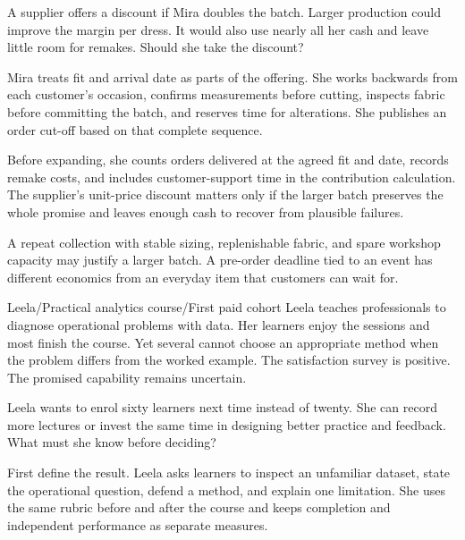 \documentclass[11pt,twoside,openright]{book}
\begin{document}
A supplier offers a discount if Mira doubles the batch. Larger production could
improve the margin per dress. It would also use nearly all her cash and leave
little room for remakes. Should she take the discount?


Mira treats fit and arrival date as parts of the offering. She works backwards
from each customer's occasion, confirms measurements before cutting, inspects
fabric before committing the batch, and reserves time for alterations. She
publishes an order cut-off based on that complete sequence.

Before expanding, she counts orders delivered at the agreed fit and date,
records remake costs, and includes customer-support time in the contribution
calculation. The supplier's unit-price discount matters only if the larger
batch preserves the whole promise and leaves enough cash to recover from
plausible failures.

A repeat collection with stable sizing, replenishable fabric, and spare workshop
capacity may justify a larger batch. A pre-order deadline tied to an event has
different economics from an everyday item that customers can wait for.

  {Leela\quad /\quad Practical analytics course\quad /\quad First paid cohort}
Leela teaches professionals to diagnose operational problems with data. Her
learners enjoy the sessions and most finish the course. Yet several cannot
choose an appropriate method when the problem differs from the worked example.
The satisfaction survey is positive. The promised capability remains uncertain.

Leela wants to enrol sixty learners next time instead of twenty. She can record
more lectures or invest the same time in designing better practice and feedback.
What must she know before deciding?


First define the result. Leela asks learners to inspect an unfamiliar dataset,
state the operational question, defend a method, and explain one limitation.
She uses the same rubric before and after the course and keeps completion and
independent performance as separate measures.
\end{document}
